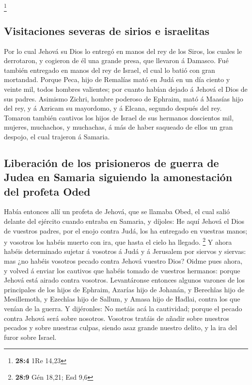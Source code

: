 \footnote{\textbf{28:4} 1Re 14,23}

\hypertarget{visitaciones-severas-de-sirios-e-israelitas}{%
\subsection{Visitaciones severas de sirios e
israelitas}\label{visitaciones-severas-de-sirios-e-israelitas}}

 Por lo cual Jehová su Dios lo entregó en manos del rey de
los Siros, los cuales le derrotaron, y cogieron de él una grande presa,
que llevaron á Damasco. Fué también entregado en manos del rey de
Israel, el cual lo batió con gran mortandad.  Porque Peca,
hijo de Remalías mató en Judá en un día ciento y veinte mil, todos
hombres valientes; por cuanto habían dejado á Jehová el Dios de sus
padres.  Asimismo Zichri, hombre poderoso de Ephraim, mató á
Maasías hijo del rey, y á Azricam su mayordomo, y á Elcana, segundo
después del rey.  Tomaron también cautivos los hijos de
Israel de sus hermanos doscientos mil, mujeres, muchachos, y muchachas,
á más de haber saqueado de ellos un gran despojo, el cual trajeron á
Samaria.

\hypertarget{liberaciuxf3n-de-los-prisioneros-de-guerra-de-judea-en-samaria-siguiendo-la-amonestaciuxf3n-del-profeta-oded}{%
\subsection{Liberación de los prisioneros de guerra de Judea en Samaria
siguiendo la amonestación del profeta
Oded}\label{liberaciuxf3n-de-los-prisioneros-de-guerra-de-judea-en-samaria-siguiendo-la-amonestaciuxf3n-del-profeta-oded}}

 Había entonces allí un profeta de Jehová, que se llamaba
Obed, el cual salió delante del ejército cuando entraba en Samaria, y
díjoles: He aquí Jehová el Dios de vuestros padres, por el enojo contra
Judá, los ha entregado en vuestras manos; y vosotros los habéis muerto
con ira, que hasta el cielo ha llegado. \footnote{\textbf{28:9} Gén
  18,21; Esd 9,6}  Y ahora habéis determinado sujetar á
vosotros á Judá y á Jerusalem por siervos y siervas: mas ¿no habéis
vosotros pecado contra Jehová vuestro Dios?  Oidme pues
ahora, y volved á enviar los cautivos que habéis tomado de vuestros
hermanos: porque Jehová está airado contra vosotros. 
Levantáronse entonces algunos varones de los principales de los hijos de
Ephraim, Azarías hijo de Johanán, y Berechîas hijo de Mesillemoth, y
Ezechîas hijo de Sallum, y Amasa hijo de Hadlai, contra los que venían
de la guerra.  Y dijéronles: No metáis acá la cautividad;
porque el pecado contra Jehová será sobre nosotros. Vosotros tratáis de
añadir sobre nuestros pecados y sobre nuestras culpas, siendo asaz
grande nuestro delito, y la ira del furor sobre Israel.

